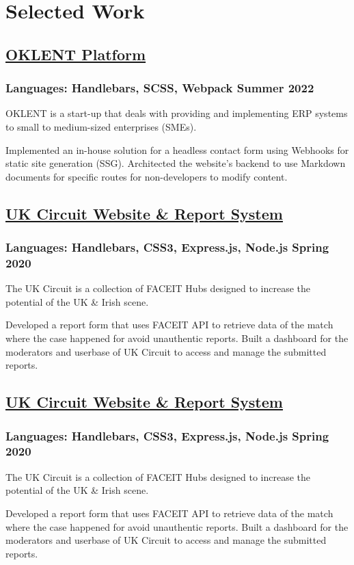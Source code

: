 \section*{Selected Work}
%
%
%
\subsection*{
	\href{https://oklent.com/}{OKLENT Platform}
}
\subsubsection*{
	Languages: Handlebars, SCSS, Webpack
	\hspace*{\fill}
	Summer 2022
}
OKLENT is a start-up that deals with providing and implementing ERP systems
to small to medium-sized enterprises (SMEs).
\vspace{2mm}
\begin{tasks}
	\task Implemented an in-house solution for a headless contact form using Webhooks for
	static site generation (SSG).
	\task Architected the website's backend to use Markdown documents for specific routes for 
	non-developers to modify content.
\end{tasks}
%
%
\subsection*{
	\href{https://www.ukcircuit.co.uk/}{UK Circuit Website \& Report System}
}
\subsubsection*{
	Languages: Handlebars, CSS3, Express.js, Node.js
	\hspace*{\fill}
	Spring 2020
}
The UK Circuit is a collection of FACEIT Hubs designed to increase the potential of
the UK \& Irish scene.
\begin{tasks}
	\task Developed a report form that uses FACEIT API to retrieve data of the match where the
	case happened for avoid unauthentic reports.
	\task Built a dashboard for the moderators and userbase of UK Circuit to access and manage
	the submitted reports.
\end{tasks}
%
%
\subsection*{
	\href{https://www.ukcircuit.co.uk/}{UK Circuit Website \& Report System}
}
\subsubsection*{
	Languages: Handlebars, CSS3, Express.js, Node.js
	\hspace*{\fill}
	Spring 2020
}
The UK Circuit is a collection of FACEIT Hubs designed to increase the potential of
the UK \& Irish scene.
\begin{tasks}
	\task Developed a report form that uses FACEIT API to retrieve data of the match where the
	case happened for avoid unauthentic reports.
	\task Built a dashboard for the moderators and userbase of UK Circuit to access and manage
	the submitted reports.
\end{tasks}
%
%
